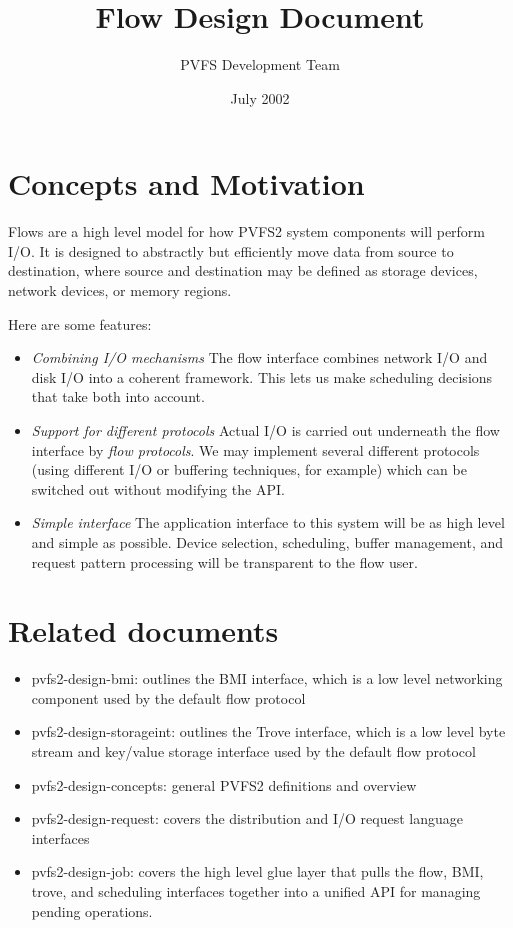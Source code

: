 \documentclass[12pt]{article} %
\title{Flow Design Document}
\author{PVFS Development Team}
\date{July 2002}
\begin{document}
\maketitle

\section{Concepts and Motivation}

Flows are a high level model for how PVFS2 system components
will perform I/O.  It is designed to abstractly but efficiently move
data from source to destination, where source and destination may be
defined as storage devices, network devices, or memory regions.

Here are some features:

\begin{itemize}

\item \emph{Combining I/O mechanisms}  The flow interface combines
network I/O and disk I/O into a coherent framework.  This lets us
make scheduling decisions that take both into account.

\item \emph{Support for different protocols}
Actual I/O is carried out underneath the flow interface by
\emph{flow protocols}.   We may implement several different
protocols (using different I/O or buffering techniques, for example)
which can be switched out without modifying the API.

\item \emph{Simple interface}  The application interface to
this system will be as high level and simple as possible.  Device
selection, scheduling, buffer management, and request pattern
processing will be transparent to the flow user.  

\end{itemize}

\section{Related documents}

\begin{itemize}
\item pvfs2-design-bmi: outlines the BMI interface, which is a low
level networking component used by the default flow protocol
\item pvfs2-design-storageint: outlines the Trove interface, which
is a low level byte stream and key/value storage interface used by
the default flow protocol
\item pvfs2-design-concepts: general PVFS2 definitions and overview
\item pvfs2-design-request: covers the distribution and I/O
request language interfaces
\item pvfs2-design-job: covers the high level glue layer that
pulls the flow, BMI, trove, and scheduling interfaces together
into a unified API for managing pending operations.
\end{itemize}
\end{document}
